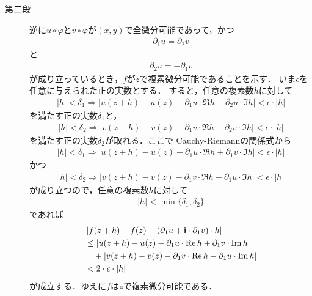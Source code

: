 \begin{sketch}
\begin{description}
			\item[第二段]
				逆に$u \circ \varphi$と$v \circ \varphi$が$(x,y)$で全微分可能であって，かつ
				\begin{align}
					\partial_1 u = \partial_2 v
				\end{align}
				と
				\begin{align}
					\partial_2 u = -\partial_1 v
				\end{align}
				が成り立っているとき，$f$が$z$で複素微分可能であることを示す．
				いま$\epsilon$を任意に与えられた正の実数とする．
				すると，任意の複素数$h$に対して
				\begin{align}
					|h| < \delta_1 \Longrightarrow
					\left|u(z+h) - u(z) - \partial_1 u \cdot \Re{h} - \partial_2 u \cdot \Im{h}\right| < \epsilon \cdot |h|
				\end{align}
				を満たす正の実数$\delta_1$と，
				\begin{align}
					|h| < \delta_2 \Longrightarrow
					\left|v(z+h) - v(z) - \partial_1 v \cdot \Re{h} - \partial_2 v \cdot \Im{h}\right| < \epsilon \cdot |h|
				\end{align}
				を満たす正の実数$\delta_2$が取れる．ここで
				Cauchy-Riemannの関係式から
				\begin{align}
					|h| < \delta_1 \Longrightarrow
					\left|u(z+h) - u(z) - \partial_1 u \cdot \Re{h} + \partial_1 v \cdot \Im{h}\right| < \epsilon \cdot |h|
				\end{align}
				かつ
				\begin{align}
					|h| < \delta_2 \Longrightarrow
					\left|v(z+h) - v(z) - \partial_1 v \cdot \Re{h} - \partial_1 u \cdot \Im{h}\right| < \epsilon \cdot |h|
				\end{align}
				が成り立つので，任意の複素数$h$に対して
				\begin{align}
					|h| < \min{\{\delta_1,\delta_2\}}
				\end{align}
				であれば
				\begin{align}
					&\left|f(z+h) - f(z) - (\partial_1 u + \mathbf{i} \cdot \partial_1 v) \cdot h\right| \\
					&\leq \left|u(z+h) - u(z) - \partial_1 u \cdot \operatorname{Re} h + \partial_1 v \cdot \operatorname{Im} h\right| \\
					&\quad + \left|v(z+h) - v(z) - \partial_1 v \cdot \operatorname{Re} h - \partial_1 u \cdot \operatorname{Im} h\right| \\
					&< 2 \cdot \epsilon \cdot |h|
				\end{align}
				が成立する．ゆえに$f$は$z$で複素微分可能である．
				\QED
		\end{description}
	\end{sketch}